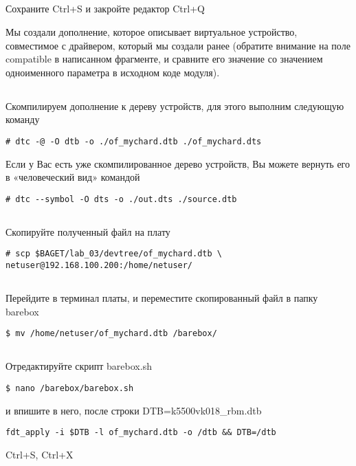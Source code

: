 \subsection{}Сохраните Ctrl+S и закройте редактор Ctrl+Q

Мы создали дополнение, которое описывает виртуальное устройство, совместимое с драйвером, который мы создали ранее (обратите внимание на поле compatible в написанном фрагменте, и сравните его значение со значением одноименного параметра в исходном коде модуля). 

\subsection{}Скомпилируем дополнение к дереву устройств, для этого выполним следующую команду
\begin{lstlisting}[style=bash]
# dtc -@ -O dtb -o ./of_mychard.dtb ./of_mychard.dts
\end{lstlisting}

\vspace{5mm}
Если у Вас есть уже скомпилированное дерево устройств, Вы можете вернуть его в «человеческий вид» командой 
\begin{lstlisting}[style=bash]
# dtc --symbol -O dts -o ./out.dts ./source.dtb
\end{lstlisting}

\subsection{}Скопируйте полученный файл на плату
\begin{lstlisting}[style=bash]
# scp $BAGET/lab_03/devtree/of_mychard.dtb \
netuser@192.168.100.200:/home/netuser/
\end{lstlisting}

\subsection{}Перейдите в терминал платы, и переместите скопированный файл в папку barebox
\begin{lstlisting}[style=bash]
$ mv /home/netuser/of_mychard.dtb /barebox/
\end{lstlisting}

\subsection{}Отредактируйте скрипт barebox.sh
\begin{lstlisting}[style=bash]
$ nano /barebox/barebox.sh
\end{lstlisting}
и впишите в него, после строки DTB=k5500vk018\_rbm.dtb
\begin{lstlisting}[style=stdout]
fdt_apply -i $DTB -l of_mychard.dtb -o /dtb && DTB=/dtb
\end{lstlisting}
Ctrl+S, Ctrl+X 

